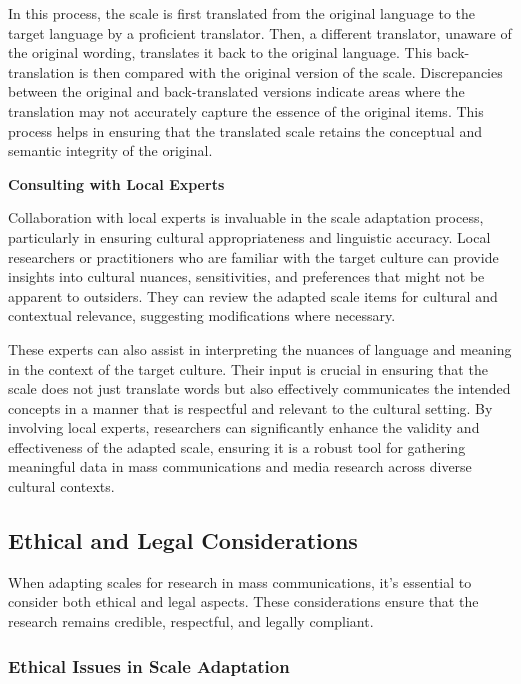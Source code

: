 \documentclass[
]{book}
\begin{document}
In this process, the scale is first translated from the original language to the target language by a proficient translator. Then, a different translator, unaware of the original wording, translates it back to the original language. This back-translation is then compared with the original version of the scale. Discrepancies between the original and back-translated versions indicate areas where the translation may not accurately capture the essence of the original items. This process helps in ensuring that the translated scale retains the conceptual and semantic integrity of the original.

\textbf{Consulting with Local Experts}

Collaboration with local experts is invaluable in the scale adaptation process, particularly in ensuring cultural appropriateness and linguistic accuracy. Local researchers or practitioners who are familiar with the target culture can provide insights into cultural nuances, sensitivities, and preferences that might not be apparent to outsiders. They can review the adapted scale items for cultural and contextual relevance, suggesting modifications where necessary.

These experts can also assist in interpreting the nuances of language and meaning in the context of the target culture. Their input is crucial in ensuring that the scale does not just translate words but also effectively communicates the intended concepts in a manner that is respectful and relevant to the cultural setting. By involving local experts, researchers can significantly enhance the validity and effectiveness of the adapted scale, ensuring it is a robust tool for gathering meaningful data in mass communications and media research across diverse cultural contexts.

\subsection*{Ethical and Legal Considerations}\label{ethical-and-legal-considerations}

When adapting scales for research in mass communications, it's essential to consider both ethical and legal aspects. These considerations ensure that the research remains credible, respectful, and legally compliant.

\subsubsection*{Ethical Issues in Scale Adaptation}\label{ethical-issues-in-scale-adaptation}
\end{document}
